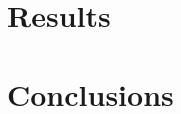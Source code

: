 \lipsum[14]

\section{Results} \label{sec:results}

\lipsum[15-18]

\section{Conclusions} \label{sec:conclusions}

\lipsum[19-23]

